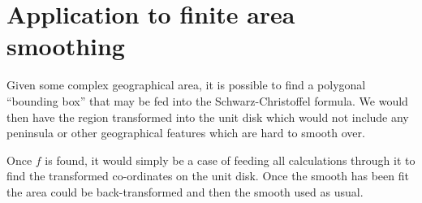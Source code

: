 \documentclass[a4paper,10pt]{amsart}
\newcommand{\sch}{Schwarz-Christoffel }
\begin{document}
\section{Application to finite area smoothing}

Given some complex geographical area, it is possible to find a polygonal ``bounding box'' that may be fed into the \sch formula. We would then have the region transformed into the  unit disk which would not include any peninsula or other geographical features which are hard to smooth over.

Once $f$ is found, it would simply be a case of feeding all calculations through it to find the transformed co-ordinates on the unit disk. Once the smooth has been fit the area could be back-transformed and then the smooth used as usual.





\end{document}
